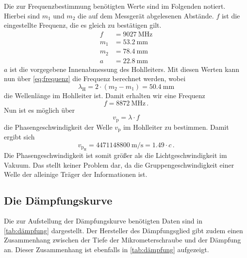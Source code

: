 Die zur Frequenzbestimmung benötigten Werte sind im Folgenden notiert.
Hierbei sind $m_1$ und $m_2$ die auf dem Messgerät abgelesenen Abstände.
$f$ ist die eingestellte Frequenz, die es gleich zu bestätigen gilt.
\begin{align*}
    f &= \SI{9027}{\mega\hertz} \\
    m_1 &= \SI{53.2}{\milli\meter} \\
    m_2 &= \SI{78.4}{\milli\meter} \\
    a &= \SI{22.8}{\milli\meter}
\end{align*}
$a$ ist die vorgegebene Innenabmessung des Hohlleiters.
Mit diesen Werten kann nun über \autoref{eq:frequenz} die Frequenz berechnet werden, wobei 
\begin{equation}
    \lambda _\text{H} = 2 \cdot (m_2 - m_1)= \SI{50.4}{\milli\meter}
    \label{eq:welle}
\end{equation}
die Wellenlänge im Hohlleiter ist.
Damit erhalten wir eine Frequenz
\begin{equation*}
    f = \SI{8872}{\mega\hertz} \, .
\end{equation*}
Nun ist es möglich über
\begin{equation}
    v_\text{p} = \lambda \cdot f
    \label{eq:phasengeschw}
\end{equation}
die Phasengeschwindigkeit der Welle $v_\text{p}$ im Hohlleiter zu bestimmen.
Damit ergibt sich 
\begin{equation*}
    v_\text{p} _\text{H} =  \SI{4471148800}{\meter\per\second} = \num{1.49} \cdot c \, .
\end{equation*}
Die Phasengeschwindigkeit ist somit größer als die Lichtgeschwindigkeit im Vakuum.
Das stellt keiner Problem dar, da die Gruppengeschwindigkeit einer Welle der alleinige Träger der Informationen ist.

\subsection{Die Dämpfungskurve}
\label{ssec:a3}

Die zur Aufstellung der Dämpfungskurve benötigten Daten sind in \autoref{tab:dämpfung} dargestellt. 
Der Hersteller des Dämpfungsglied gibt zudem einen Zusammenhang zwischen der Tiefe der Mikrometerschraube und der Dämpfung an.
Dieser Zusammenhang ist ebenfalls in \autoref{tab:dämpfung} aufgezeigt.

